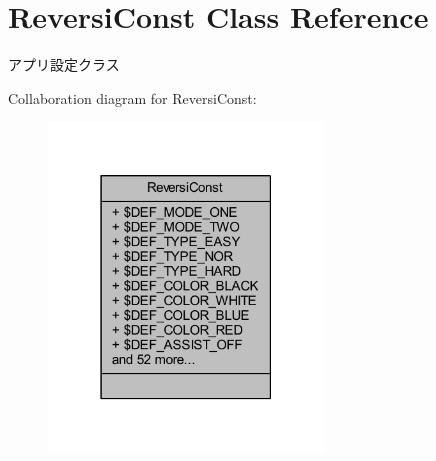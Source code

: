 \hypertarget{class_reversi_const}{}\section{Reversi\+Const Class Reference}
\label{class_reversi_const}


アプリ設定クラス  




Collaboration diagram for Reversi\+Const\+:
\nopagebreak
\begin{figure}[H]
\begin{center}
\leavevmode
\includegraphics[width=207pt]{class_reversi_const__coll__graph}
\end{center}
\end{figure}
